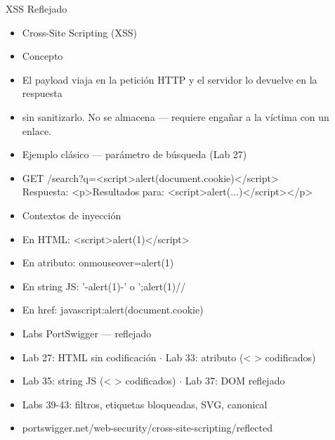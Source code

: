\documentclass[aspectratio=169,10pt]{beamer}
\newcommand{\cmdbox}[1]{%
  \begin{center}%
  {\setlength{\fboxsep}{6pt}\colorbox{uzlav!40}{\parbox{0.88\linewidth}{\ttfamily\footnotesize #1}}}%
  \end{center}}
\begin{document}
\begin{frame}[allowframebreaks]{XSS Reflejado}
\small
  \begin{itemize}
  \item Cross-Site Scripting (XSS)
  \item Concepto
  \item El payload viaja en la petición HTTP y el servidor lo devuelve en la respuesta
  \item sin sanitizarlo. No se almacena --- requiere engañar a la víctima con un enlace.
  \item Ejemplo clásico --- parámetro de búsqueda (Lab 27)
  \item[] \cmdbox{GET /search?q=\textless{}script\textgreater{}alert(document.cookie)\textless{}/script\textgreater{}\\{}
Respuesta: \textless{}p\textgreater{}Resultados para: \textless{}script\textgreater{}alert(...)\textless{}/script\textgreater{}\textless{}/p\textgreater{}}
  \item Contextos de inyección
  \item En HTML: \textless{}script\textgreater{}alert(1)\textless{}/script\textgreater{}
  \item En atributo: \textquotedbl{} onmouseover=\textquotedbl{}alert(1)
  \item En string JS: '-alert(1)-' o ';alert(1)//
  \item En href: javascript:alert(document.cookie)
  \item Labs PortSwigger --- reflejado
  \item Lab 27: HTML sin codificación $\cdot$ Lab 33: atributo (\textless{} \textgreater{} codificados)
  \item Lab 35: string JS (\textless{} \textgreater{} codificados) $\cdot$ Lab 37: DOM reflejado
  \item Labs 39-43: filtros, etiquetas bloqueadas, SVG, canonical
  \item portswigger.net/web-security/cross-site-scripting/reflected
  \end{itemize}
\end{frame}
\end{document}

